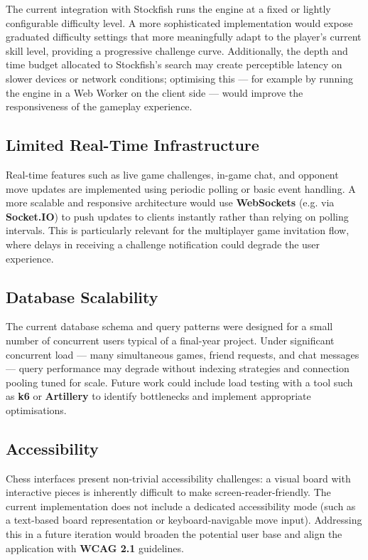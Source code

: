 The current integration with Stockfish runs the engine at a fixed or lightly configurable difficulty level. A more sophisticated implementation would expose graduated difficulty settings that more meaningfully adapt to the player's current skill level, providing a progressive challenge curve. Additionally, the depth and time budget allocated to Stockfish's search may create perceptible latency on slower devices or network conditions; optimising this — for example by running the engine in a Web Worker on the client side — would improve the responsiveness of the gameplay experience.

\subsection*{Limited Real-Time Infrastructure}

Real-time features such as live game challenges, in-game chat, and opponent move updates are implemented using periodic polling or basic event handling. A more scalable and responsive architecture would use \textbf{WebSockets} (e.g. via \textbf{Socket.IO}) to push updates to clients instantly rather than relying on polling intervals. This is particularly relevant for the multiplayer game invitation flow, where delays in receiving a challenge notification could degrade the user experience.

\subsection*{Database Scalability}

The current database schema and query patterns were designed for a small number of concurrent users typical of a final-year project. Under significant concurrent load — many simultaneous games, friend requests, and chat messages — query performance may degrade without indexing strategies and connection pooling tuned for scale. Future work could include load testing with a tool such as \textbf{k6} or \textbf{Artillery} to identify bottlenecks and implement appropriate optimisations.

\subsection*{Accessibility}

Chess interfaces present non-trivial accessibility challenges: a visual board with interactive pieces is inherently difficult to make screen-reader-friendly. The current implementation does not include a dedicated accessibility mode (such as a text-based board representation or keyboard-navigable move input). Addressing this in a future iteration would broaden the potential user base and align the application with \textbf{WCAG 2.1} guidelines.

